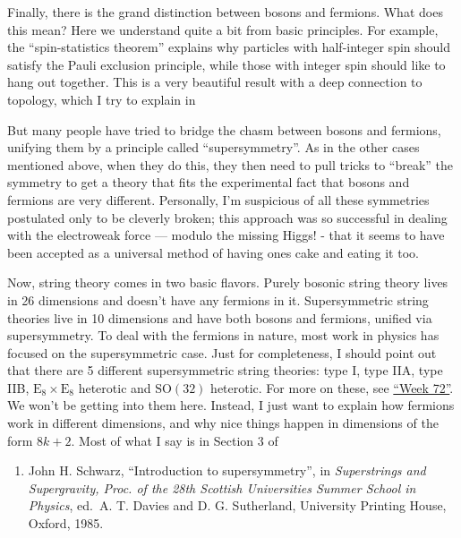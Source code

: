 \documentclass{article}
\def\tightlist{}
\renewcommand{\texttt}[1]{%
  \begingroup
  \ttfamily
  \begingroup\lccode`~=`/\lowercase{\endgroup\def~}{/\discretionary{}{}{}}%
  \begingroup\lccode`~=`[\lowercase{\endgroup\def~}{[\discretionary{}{}{}}%
  \begingroup\lccode`~=`.\lowercase{\endgroup\def~}{.\discretionary{}{}{}}%
  \catcode`/=\active\catcode`[=\active\catcode`.=\active
  \scantokens{#1\noexpand}%
  \endgroup
}
\begin{document}
Finally, there is the grand distinction between bosons and fermions.
What does this mean? Here we understand quite a bit from basic
principles. For example, the ``spin-statistics theorem'' explains why
particles with half-integer spin should satisfy the Pauli exclusion
principle, while those with integer spin should like to hang out
together. This is a very beautiful result with a deep connection to
topology, which I try to explain in


But many people have tried to bridge the chasm between bosons and
fermions, unifying them by a principle called ``supersymmetry''. As in
the other cases mentioned above, when they do this, they then need to
pull tricks to ``break'' the symmetry to get a theory that fits the
experimental fact that bosons and fermions are very different.
Personally, I'm suspicious of all these symmetries postulated only to be
cleverly broken; this approach was so successful in dealing with the
electroweak force --- modulo the missing Higgs! - that it seems to have
been accepted as a universal method of having ones cake and eating it
too.

Now, string theory comes in two basic flavors. Purely bosonic string
theory lives in 26 dimensions and doesn't have any fermions in it.
Supersymmetric string theories live in 10 dimensions and have both
bosons and fermions, unified via supersymmetry. To deal with the
fermions in nature, most work in physics has focused on the
supersymmetric case. Just for completeness, I should point out that
there are 5 different supersymmetric string theories: type I, type IIA,
type IIB, \(\mathrm{E}_8\times\mathrm{E}_8\) heterotic and
\(\mathrm{SO}(32)\) heterotic. For more on these, see
\protect\hyperlink{week72}{``Week 72''}. We won't be getting into them
here. Instead, I just want to explain how fermions work in different
dimensions, and why nice things happen in dimensions of the form
\(8k + 2\). Most of what I say is in Section 3 of

\begin{enumerate}
\def\labelenumi{\arabic{enumi})}
\setcounter{enumi}{2}
\tightlist
\item
  John H. Schwarz, ``Introduction to supersymmetry'', in
  \emph{Superstrings and Supergravity, Proc. of the 28th Scottish
  Universities Summer School in Physics}, ed.~A. T. Davies and D. G.
  Sutherland, University Printing House, Oxford, 1985.
\end{enumerate}
\end{document}
